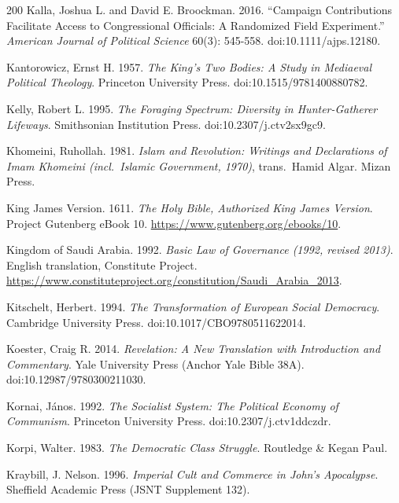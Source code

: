 \documentclass[11pt,letterpaper]{article}
\theoremstyle{definition}
\theoremstyle{remark}
\begin{document}
\begin{thebibliography}{200}
Kalla, Joshua L. and David E. Broockman. 2016. ``Campaign Contributions Facilitate Access to Congressional Officials: A Randomized Field Experiment.'' \emph{American Journal of Political Science} 60(3): 545-558. doi:10.1111/ajps.12180.

Kantorowicz, Ernst H. 1957. \emph{The King's Two Bodies: A Study in Mediaeval Political Theology}. Princeton University Press. doi:10.1515/9781400880782.

Kelly, Robert L. 1995. \emph{The Foraging Spectrum: Diversity in Hunter-Gatherer Lifeways}. Smithsonian Institution Press. doi:10.2307/j.ctv2sx9gc9.

Khomeini, Ruhollah. 1981. \emph{Islam and Revolution: Writings and Declarations of Imam Khomeini (incl.~Islamic Government, 1970)}, trans.~Hamid Algar. Mizan Press.

King James Version. 1611. \emph{The Holy Bible, Authorized King James Version}. Project Gutenberg eBook 10. \url{https://www.gutenberg.org/ebooks/10}.

Kingdom of Saudi Arabia. 1992. \emph{Basic Law of Governance (1992, revised 2013)}. English translation, Constitute Project. \url{https://www.constituteproject.org/constitution/Saudi_Arabia_2013}.

Kitschelt, Herbert. 1994. \emph{The Transformation of European Social Democracy}. Cambridge University Press. doi:10.1017/CBO9780511622014.

Koester, Craig R. 2014. \emph{Revelation: A New Translation with Introduction and Commentary}. Yale University Press (Anchor Yale Bible 38A). doi:10.12987/9780300211030.

Kornai, J\'anos. 1992. \emph{The Socialist System: The Political Economy of Communism}. Princeton University Press. doi:10.2307/j.ctv1ddczdr.

Korpi, Walter. 1983. \emph{The Democratic Class Struggle}. Routledge \& Kegan Paul.

Kraybill, J. Nelson. 1996. \emph{Imperial Cult and Commerce in John's Apocalypse}. Sheffield Academic Press (JSNT Supplement 132).


\end{thebibliography}
\end{document}
